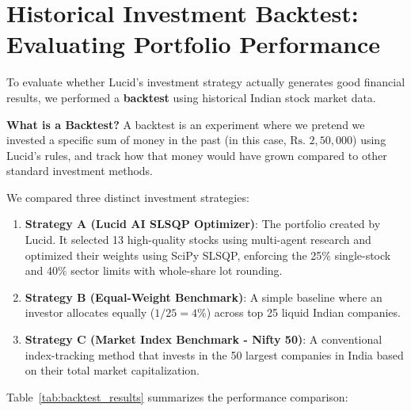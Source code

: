\section{Historical Investment Backtest: Evaluating Portfolio Performance}
To evaluate whether Lucid's investment strategy actually generates good financial results, we performed a \textbf{backtest} using historical Indian stock market data.

\noindent \textbf{What is a Backtest?}
A backtest is an experiment where we pretend we invested a specific sum of money in the past (in this case, $\text{Rs.~}2,50,000$) using Lucid's rules, and track how that money would have grown compared to other standard investment methods.

We compared three distinct investment strategies:
\begin{enumerate}
    \item \textbf{Strategy A (Lucid AI SLSQP Optimizer)}: The portfolio created by Lucid. It selected 13 high-quality stocks using multi-agent research and optimized their weights using SciPy SLSQP, enforcing the 25\% single-stock and 40\% sector limits with whole-share lot rounding.
    \item \textbf{Strategy B (Equal-Weight Benchmark)}: A simple baseline where an investor allocates equally ($1/25 = 4\%$) across top 25 liquid Indian companies.
    \item \textbf{Strategy C (Market Index Benchmark - Nifty 50)}: A conventional index-tracking method that invests in the 50 largest companies in India based on their total market capitalization.
\end{enumerate}

Table~\ref{tab:backtest_results} summarizes the performance comparison:

